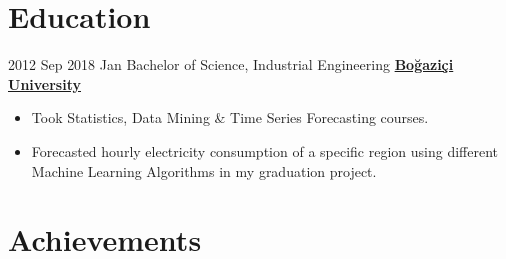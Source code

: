 \documentclass[letterpaper]{DS_class_file} %
\begin{document}
	
	\section{Education}
	
	\begin{twenty} %
	
		   \twentyitem
			{2012 Sep}
			{2018 Jan}
			{\hspace{0.2cm}Bachelor of Science, Industrial Engineering}
			{\href{http://www.ie.boun.edu.tr/}{\hspace{0.27cm} \textbf{Boğaziçi University} }}
			{}
			{\begin{itemize}
				\item Took Statistics, Data Mining \& Time Series Forecasting courses.
				\item Forecasted hourly electricity consumption of a specific region using different Machine Learning Algorithms in my graduation project.
	
			\end{itemize}} 
	\end{twenty}
	
	
	\section{Achievements}
	
\end{document}
